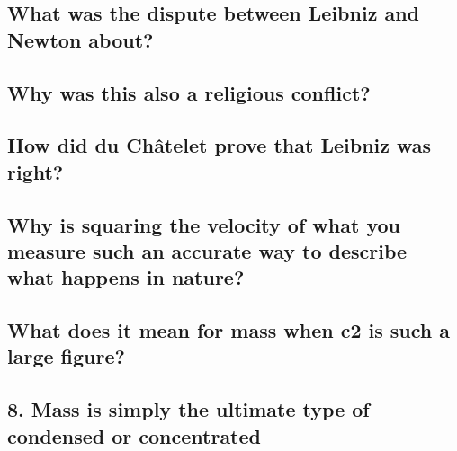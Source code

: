 \subsection{What was the dispute between Leibniz and Newton about?}

\subsection{Why was this also a religious conflict?}

\subsection{How did du Châtelet prove that Leibniz was right?}

\subsection{Why is squaring the velocity of what you measure such an accurate way to describe
what happens in nature?}

\subsection{What does it mean for mass when c2 is such a large figure?}

\subsection{8. Mass is simply the ultimate type of condensed or concentrated}
